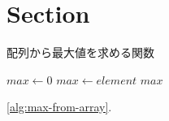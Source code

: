 \documentclass[uplatex, 10pt, a4paper, titlepage,dvipdfmx]{jsarticle}
\begin{document}
\makeatletter
\renewcommand{\ALG@name}{アルゴリズム}
\makeatother

\section{Section}

\begin{algorithm}[tb]
    \caption{配列から最大値を求める関数}
    \label{alg:max-from-array}
    \begin{algorithmic}[1]
        \State $max \gets 0$
        \State $max \gets element$
        \EndIf
        \EndFor
        \State \Return $max$
        \EndFunction
    \end{algorithmic}
\end{algorithm}

\ref{alg:max-from-array}.

\cite{vaswani2017attention}

{
    \footnotesize
    
}
\end{document}
